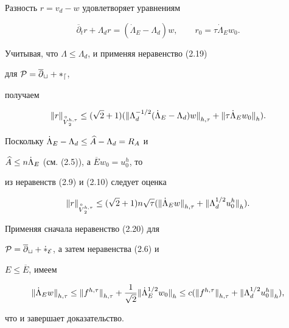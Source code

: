 \begin{pf}


Разность $r=v_d-w$ удовлетворяет уравнениям


$$


\overline{\partial}_t r+\Lambda_d r=(\Dot\Lambda_E-\Lambda_d)w,


\qquad r_0=\tau{\Dot\Lambda}_Ew_0.


$$


Учитывая, что $\Lambda\le\Lambda_d$, и применяя неравенство (2.19)


для $\cal P=\overline\partial_t+\Lambda_d$,


получаем


$$


{\ver r \ver}_{\overset{\circ}{V}{}_2^{h,\tau}}\le(\sqrt 2+1)


({\ver\Lambda_d^{-1/2}(\Dot\Lambda_E-\Lambda_d) w\ver}_{h,\tau}+


{\ver \tau{\Dot\Lambda}_Ew_0\ver}_{h}).


$$


Поскольку $\Dot\Lambda_E-\Lambda_d\le \widehat A-\Lambda_d=R_A$ и 


$\widehat A\le n\Dot\Lambda_E$ (см. (2.5)), а $\overline E w_0=u_0^h$, то 


из неравенств (2.9) и (2.10) следует оценка


$$


{\ver r \ver}_{\overset{\circ}{V}{}_2^{h,\tau}}\le(\sqrt 2+1)


n\sqrt\tau(


{\ver\Dot\Lambda_Ew\ver}_{h,\tau}+{\ver \Lambda_d^{1/2}u_0^h\ver}_{h}).


$$


Применяя сначала неравенство (2.20) для


$\cal P=\overline\partial_t+\Dot\Lambda_E$, а затем неравенства (2.6) и


$E\le\overline E$, имеем


$$


{\ver\Dot\Lambda_E w\ver}_{h,\tau}\le {\ver f^{h,\tau}\ver}_{h,\tau}+


\frac{1}{\sqrt 2}{\ver \Dot\Lambda_E^{1/2}w_0\ver}_h


\le c({\ver f^{h,\tau}\ver}_{h,\tau}+{\ver\Lambda_d^{1/2}u_0^h\ver}_h),


$$


что и завершает доказательство.


\end{pf}





